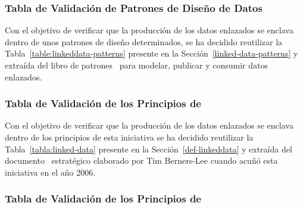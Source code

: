 \subsubsection{Tabla de Validación de Patrones de Diseño de Datos}
Con el objetivo de verificar que la producción de los datos enlazados
se enclava dentro de unos patrones de diseño determinados, se ha decidido
reutilizar la Tabla~\ref{table:linkeddata-patterns} presente en la Sección~\ref{linked-data-patterns} y
extraída del libro de patrones~\cite{linked-data-patterns} para modelar, publicar y consumir datos enlazados.


\subsubsection{Tabla de Validación de los Principios de \linkeddata}
Con el objetivo de verificar que la producción de los datos enlazados
se enclava dentro de los principios de esta iniciativa se ha decidido
reutilizar la Tabla~\ref{tabla:linked-data} presente en la Sección~\ref{def-linkeddata} y
extraída del documento~\cite{Berners-Lee-2006} estratégico elaborado por Tim Berners-Lee cuando acuñó esta iniciativa en el año 2006.

\subsubsection{Tabla de Validación de los Principios de \opendata}

